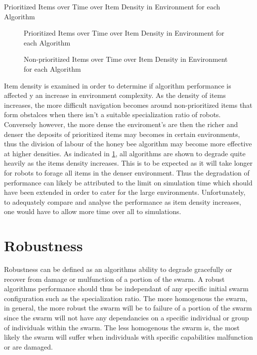 \begin{table} [h]
     \caption{Prioritized Items over Time over Item Density in Environment for each Algorithm}
     \label{ratio}
	\centering
	\footnotesize
	
\end{table}


\begin{figure}[!htb]
\centering
\resizebox{\textwidth}{!}{}
\caption{Prioritized Items over Time over Item Density in Environment  for each Algorithm}
\label{objectgoldplot}
\end{figure}


\begin{figure}[!htb]
\centering
\resizebox{\textwidth}{!}{}
\caption{Non-prioritized Items over Time over Item Density in Environment for each Algorithm}
\label{objectwasteplot}
\end{figure}

Item density is examined in order to determine if algorithm performance is affected y an increase in environment complexity. As the density of items increases, the more difficult navigation becomes around non-prioritized items that form obstalces when there isn't a suitable specialization ratio of robots. Conversely however, the more dense the enviroment's are then the richer and denser the deposits of prioritized items may becomes in certain environments, thus the division of labour of the honey bee algorithm may become more effective at higher densities. As indicated in \ref{objectgoldplot}, all algorithms are shown to degrade quite heavily as the items density increases. This is to be expected as it will take longer for robots to forage all items in the denser environment. Thus the degradation of performance can likely be attributed to the limit on simulation time which should have been extended in order to cater for the large environments. Unfortunately, to adequately compare and analyse the performance as item density increases, one would have to allow more time over all to simulations.

\section{Robustness}
\label{results:robustness}

Robustness can be defined as an algorithms ability to degrade gracefully or recover from damage or mulfunction of a portion of the swarm. A robust algorithms performance should thus be independant of any specific initial swarm configuration such as the specialization ratio. The more homogenous the swarm, in general, the more robust the swarm will be to failure of a portion of the swarm since the swarm will not have any dependancies on a specific individual or group of individuals within the swarm. The less homogenous the swarm is, the most likely the swarm will suffer when individuals with specific capabilities malfunction or are damaged.

